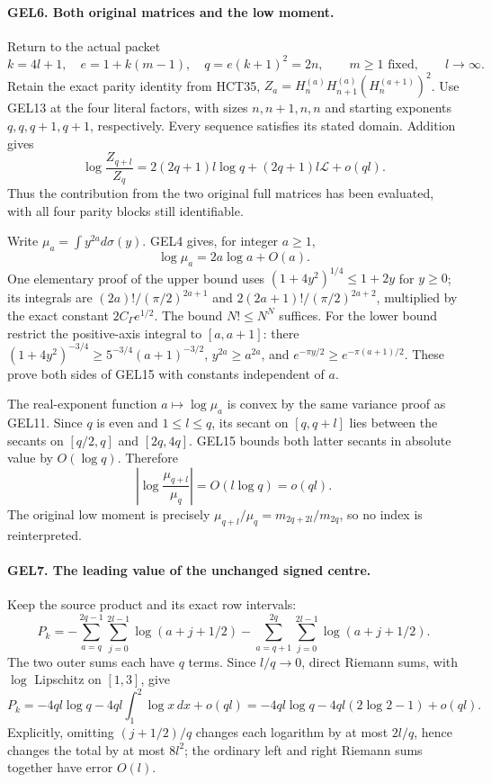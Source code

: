 \paragraph{GEL6. Both original matrices and the low moment.}
Return to the actual packet
\[
 k=4l+1,\quad e=1+k(m-1),\quad q=e(k+1)^2=2n,
 \qquad m\geq1\text{ fixed},\qquad l\to\infty.
\]
Retain the exact parity identity from HCT35,
\(Z_a=H_n^{(a)}H_{n+1}^{(a)}(H_n^{(a+1)})^2\).
Use GEL13 at the four literal factors, with sizes \(n,n+1,n,n\)
and starting exponents \(q,q,q+1,q+1\), respectively. Every sequence
satisfies its stated domain. Addition gives
\[
 \boxed{\log\frac{Z_{q+l}}{Z_q}
   =2(2q+1)l\log q+(2q+1)l\mathcal L+o(ql).}
 \tag{GEL14}
\]
Thus the contribution from the two original full matrices has been
evaluated, with all four parity blocks still identifiable.

Write \(\mu_a=\int y^{2a}d\sigma(y)\). GEL4 gives, for integer \(a\geq1\),
\[
 \log\mu_a=2a\log a+O(a).
 \tag{GEL15}
\]
One elementary proof of the upper bound uses
\((1+4y^2)^{1/4}\leq1+2y\) for \(y\geq0\); its integrals are
\((2a)!/(\pi/2)^{2a+1}\) and
\(2(2a+1)!/(\pi/2)^{2a+2}\), multiplied by the exact constant
\(2C_\Gamma e^{1/2}\). The bound \(N!\leq N^N\) suffices.
For the lower bound restrict the positive-axis integral to \([a,a+1]\):
there \((1+4y^2)^{-3/4}\geq5^{-3/4}(a+1)^{-3/2}\),
\(y^{2a}\geq a^{2a}\), and
\(e^{-\pi y/2}\geq e^{-\pi(a+1)/2}\). These prove both sides of GEL15
with constants independent of \(a\).

The real-exponent function \(a\mapsto\log\mu_a\) is convex by the
same variance proof as GEL11. Since \(q\) is even and \(1\leq l\leq q\),
its secant on \([q,q+l]\) lies between the secants on \([q/2,q]\)
and \([2q,4q]\). GEL15 bounds both latter secants in absolute value
by \(O(\log q)\). Therefore
\[
 \left|\log\frac{\mu_{q+l}}{\mu_q}\right|=O(l\log q)=o(ql).
 \tag{GEL16}
\]
The original low moment is precisely
\(\mu_{q+l}/\mu_q=m_{2q+2l}/m_{2q}\), so no index is reinterpreted.

\paragraph{GEL7. The leading value of the unchanged signed centre.}
Keep the source product and its exact row intervals:
\[
 P_k=-\sum_{a=q}^{2q-1}\sum_{j=0}^{2l-1}\log(a+j+1/2)
     -\sum_{a=q+1}^{2q}\sum_{j=0}^{2l-1}\log(a+j+1/2).
\]
The two outer sums each have \(q\) terms. Since \(l/q\to0\), direct
Riemann sums, with \(\log\) Lipschitz on \([1,3]\), give
\[
 P_k=-4ql\log q-4ql\int_1^2\log x\,dx+o(ql)
     =-4ql\log q-4ql(2\log2-1)+o(ql).
 \tag{GEL17}
\]
Explicitly, omitting \((j+1/2)/q\) changes each logarithm by at most
\(2l/q\), hence changes the total by at most \(8l^2\); the ordinary
left and right Riemann sums together have error \(O(l)\).

